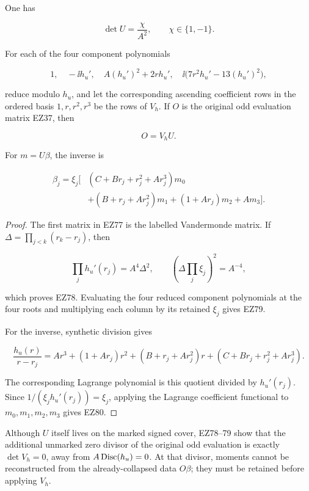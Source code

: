 \begin{theorem}
\label{thm:odd-moment-frame}
One has

\begin{equation}
 \boxed{\det U=\frac{\chi}{A^2},\qquad\chi\in\{1,-1\}.}         \tag{EZ78}
\end{equation}

For each of the four component polynomials

\[
 1,\quad -\ii h_u',\quad A(h_u')^2+2rh_u',\quad
 \ii\bigl(7r^2h_u'-13(h_u')^2\bigr),
\]

reduce modulo \(h_u\), and let the corresponding ascending coefficient rows
in the ordered basis \(1,r,r^2,r^3\) be the rows of \(V_h\).  If \(O\) is the
original odd evaluation matrix EZ37, then

\begin{equation}
 \boxed{O=V_hU.}                                      \tag{EZ79}
\end{equation}

For \(m=U\beta\), the inverse is

\begin{equation}
\boxed{
\begin{aligned}
 \beta_j=\xi_j\bigl[&
 (C+Br_j+r_j^2+Ar_j^3)m_0\\
 &+(B+r_j+Ar_j^2)m_1
 +(1+Ar_j)m_2+Am_3\bigr].
\end{aligned}}                                      \tag{EZ80}
\end{equation}
\end{theorem}

\begin{proof}
The first matrix in EZ77 is the labelled Vandermonde matrix.  If
\(\Delta=\prod_{j<k}(r_k-r_j)\), then

\[
 \prod_jh_u'(r_j)=A^4\Delta^2,
 \qquad \left(\Delta\prod_j\xi_j\right)^2=A^{-4},
\]

which proves EZ78.  Evaluating the four reduced component polynomials at the
four roots and multiplying each column by its retained \(\xi_j\) gives EZ79.

For the inverse, synthetic division gives

\[
 \frac{h_u(r)}{r-r_j}=
 Ar^3+(1+Ar_j)r^2+(B+r_j+Ar_j^2)r
 +(C+Br_j+r_j^2+Ar_j^3).
\]

The corresponding Lagrange polynomial is this quotient divided by
\(h_u'(r_j)\).  Since
\(1/(\xi_jh_u'(r_j))=\xi_j\), applying the Lagrange coefficient functional
to \(m_0,m_1,m_2,m_3\) gives EZ80.
\end{proof}

Although \(U\) itself lives on the marked signed cover, EZ78--79 show that
the additional unmarked zero divisor of the original odd evaluation is
exactly \(\det V_h=0\), away from \(A\operatorname{Disc}(h_u)=0\).  At that divisor, moments
cannot be reconstructed from the already-collapsed data \(O\beta\); they must
be retained before applying \(V_h\).
